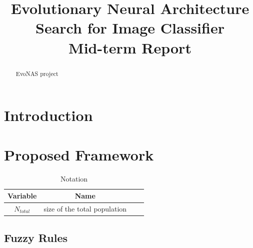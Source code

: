 \documentclass[conference]{IEEEtran}
\begin{document}
  
  \title{Evolutionary Neural Architecture Search for Image Classifier \\ Mid-term Report}
  
  \author{
  }
  
  \maketitle
  
  \begin{abstract}
  EvoNAS project
  \end{abstract}
  \IEEEpeerreviewmaketitle
  
  \section{Introduction}
  

  \section{Proposed Framework}
 
  \begin{table}[H]
    
    \centering
      \begin{tabular}{cccc}
      \toprule
      Variable&Name\\
      \midrule
     
      $N_{total}$&size of the total population\\
  \bottomrule
  \end{tabular}
  \caption{Notation}
  \label{table:1}
  \end{table}

  \subsection{Fuzzy Rules}
  
\end{document}
